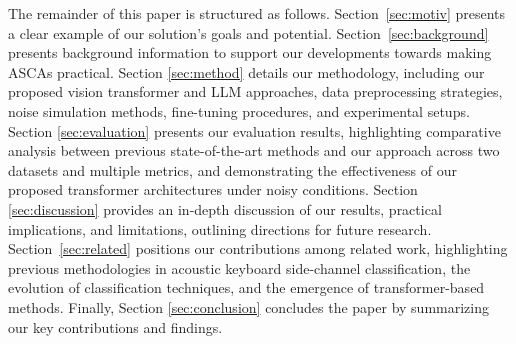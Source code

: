 The remainder of this paper is structured as follows. Section~\ref{sec:motiv} presents a clear example of our solution's goals and potential. Section~\ref{sec:background} presents background information to support our developments towards making ASCAs practical. Section \ref{sec:method} details our methodology, including our proposed vision transformer and LLM approaches, data preprocessing strategies, noise simulation methods, fine-tuning procedures, and experimental setups. Section \ref{sec:evaluation} presents our evaluation results, highlighting comparative analysis between previous state-of-the-art methods and our approach across two datasets and multiple metrics, and demonstrating the effectiveness of our proposed transformer architectures under noisy conditions. Section \ref{sec:discussion} provides an in-depth discussion of our results, practical implications, and limitations, outlining directions for future research. Section~\ref{sec:related} positions our contributions among related work, highlighting previous methodologies in acoustic keyboard side-channel classification, the evolution of classification techniques, and the emergence of transformer-based methods. Finally, Section \ref{sec:conclusion} concludes the paper by summarizing our key contributions and findings.